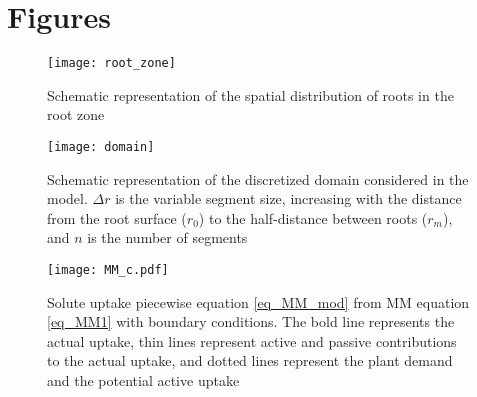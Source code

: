 \section*{Figures}

\begin{figure}[h]
\centering
\texttt{[image: root\_zone]}
\caption{Schematic representation of the spatial distribution of roots in the root zone}
\label{fig_rootzone}
\end{figure}

\begin{figure}[h]
\centering
\texttt{[image: domain]}
\caption{Schematic representation of the discretized domain considered in the model. $\Delta r$ is the variable segment size, increasing with the distance from the root surface ($r_0$) to the half-distance between roots ($r_m$), and $n$ is the number of segments}
\label{fig_scheme}
\end{figure}

\begin{figure}[h]
\centering
\texttt{[image: MM\_c.pdf]}
\caption{Solute uptake piecewise equation \ref{eq_MM_mod} from MM equation \ref{eq_MM1} with boundary conditions. The bold line represents the actual uptake, thin lines represent active and passive contributions to the actual uptake, and dotted lines represent the plant demand and the potential active uptake}
\label{fig_MM_mod}
\end{figure}


